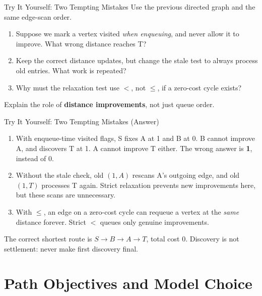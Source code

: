 \documentclass{beamer}
\begin{document}
\begin{frame}{Try It Yourself: Two Tempting Mistakes}
  Use the previous directed graph and the same edge-scan order.
  \begin{enumerate}
    \item Suppose we mark a vertex visited \emph{when enqueuing}, and
      never allow it to improve. What wrong distance reaches T?
    \item Keep the correct distance updates, but change the stale test
      to always process old entries. What work is repeated?
    \item Why must the relaxation test use $<$, not $\leq$, if a
      zero-cost cycle exists?
  \end{enumerate}
  \medskip
  Explain the role of \textbf{distance improvements}, not just queue order.
\end{frame}

\begin{frame}{Try It Yourself: Two Tempting Mistakes (Answer)}
  \begin{enumerate}
    \item With enqueue-time visited flags, S fixes A at 1 and B at 0.
      B cannot improve A, and discovers T at 1. A cannot improve T
      either. The wrong answer is \textbf{1}, instead of 0.
    \item Without the stale check, old $(1,A)$ rescans A's outgoing edge,
      and old $(1,T)$ processes T again. Strict relaxation prevents
      new improvements here, but these scans are unnecessary.
    \item With $\leq$, an edge on a zero-cost cycle can requeue a vertex
      at the \emph{same} distance forever. Strict $<$ queues only genuine
      improvements.
  \end{enumerate}
  \medskip
  The correct shortest route is $S\to B\to A\to T$, total cost 0.
  Discovery is not settlement: never make first discovery final.
\end{frame}

\section{Path Objectives and Model Choice}
\end{document}
